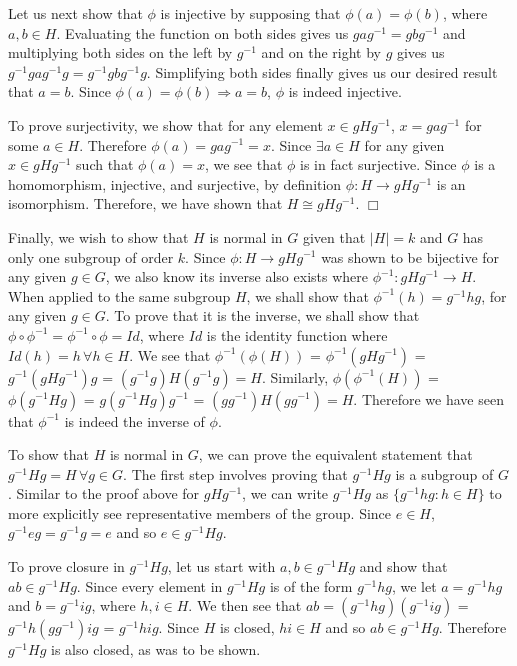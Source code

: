 \documentclass[12pt,letterpaper,reqno]{amsart}
\begin{document}
\begin{enumerate}
\begin{flushleft}
Let us next show that $\phi$ is injective by supposing that $\phi(a) = \phi(b)$, where $a, b \in H$. Evaluating the function on both sides gives us $gag^{-1} = gbg^{-1}$ and multiplying both sides on the left by $g^{-1}$ and on the right by $g$ gives us $g^{-1}gag^{-1}g = g^{-1}gbg^{-1}g$. Simplifying both sides finally gives us our desired result that $a = b$. Since $\phi(a) = \phi(b) \Rightarrow a = b$, $\phi$ is indeed injective.
\newline

To prove surjectivity, we show that for any element $x \in gHg^{-1}$, $x = gag^{-1}$ for some $a \in H$. Therefore $\phi(a) = gag^{-1} = x$. Since $\exists a \in H$ for any given $x \in gHg^{-1}$ such that $\phi(a) = x$, we see that $\phi$ is in fact surjective. Since $\phi$ is a homomorphism, injective, and surjective, by definition $\phi: H \rightarrow gHg^{-1}$ is an isomorphism. Therefore, we have shown that $H \cong gHg^{-1}$. $\Box$
\newline

Finally, we wish to show that $H$ is normal in $G$ given that $|H| = k$ and $G$ has only one subgroup of order $k$. Since $\phi: H \rightarrow gHg^{-1}$ was shown to be bijective for any given $g \in G$, we also know its inverse also exists where $\phi^{-1}: gHg^{-1} \rightarrow H$. When applied to the same subgroup $H$, we shall show that $\phi^{-1}(h) = g^{-1}hg$, for any given $g \in G$. To prove that it is the inverse, we shall show that $\phi \circ \phi^{-1} = \phi^{-1} \circ \phi = Id$, where $Id$ is the identity function where $Id(h) = h\, \forall h \in H$. We see that $\phi^{-1}(\phi(H))$ = $\phi^{-1}(gHg^{-1})$ = $g^{-1}(gHg^{-1})g$ = $(g^{-1}g)H(g^{-1}g) = H$. Similarly, $\phi(\phi^{-1}(H))$ = $\phi(g^{-1}Hg)$ = $g(g^{-1}Hg)g^{-1}$ = $(gg^{-1})H(gg^{-1}) = H$. Therefore we have seen that $\phi^{-1}$ is indeed the inverse of $\phi$.
\newline

To show that $H$ is normal in $G$, we can prove the equivalent statement that $g^{-1}Hg = H\, \forall g \in G$. The first step involves proving that $g^{-1}Hg$ is a subgroup of $G$. Similar to the proof above for $gHg^{-1}$, we can write $g^{-1}Hg$ as $\{g^{-1}hg : h \in H\}$ to more explicitly see representative members of the group. Since $e \in H$, $g^{-1}eg = g^{-1}g = e$ and so $e \in g^{-1}Hg$.
\newline

To prove closure in $g^{-1}Hg$, let us start with $a, b \in g^{-1}Hg$ and show that $ab \in g^{-1}Hg$. Since every element in $g^{-1}Hg$ is of the form $g^{-1}hg$, we let $a = g^{-1}hg$ and $b = g^{-1}ig$, where $h, i \in H$. We then see that $ab = (g^{-1}hg)(g^{-1}ig)$ = $g^{-1}h(gg^{-1})ig$ = $g^{-1}hig$. Since $H$ is closed, $hi \in H$ and so $ab \in g^{-1}Hg$. Therefore $g^{-1}Hg$ is also closed, as was to be shown.
\newline


\end{flushleft}
\end{enumerate}
\end{document}
